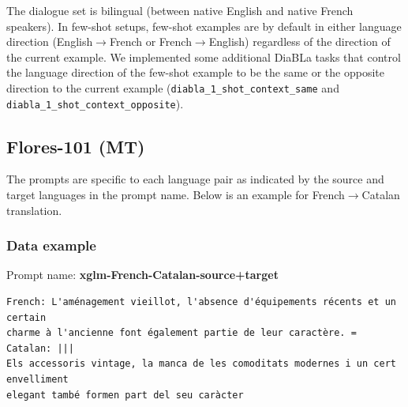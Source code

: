 \documentclass[twoside,11pt]{article}
\begin{document}

The dialogue set is bilingual (between native English and native French speakers). In few-shot setups, few-shot examples are by default in either language direction (English$\rightarrow$French or French$\rightarrow$English) regardless of the direction of the current example. We implemented some additional DiaBLa tasks that control the language direction of the few-shot example to be the same or the opposite direction to the current example (\texttt{diabla\_1\_shot\_context\_same} and \texttt{diabla\_1\_shot\_context\_opposite}).

\subsection{Flores-101 (MT)}
The prompts are specific to each language pair as indicated by the source and target languages in the prompt name. Below is an example for French$\rightarrow$Catalan translation.

\subsubsection{Data example}

Prompt name: \textbf{xglm-French-Catalan-source+target}
\begin{verbatim}
French: L'aménagement vieillot, l'absence d'équipements récents et un certain 
charme à l'ancienne font également partie de leur caractère. = Catalan: ||| 
Els accessoris vintage, la manca de les comoditats modernes i un cert envelliment 
elegant també formen part del seu caràcter
\end{verbatim}
\end{document}
